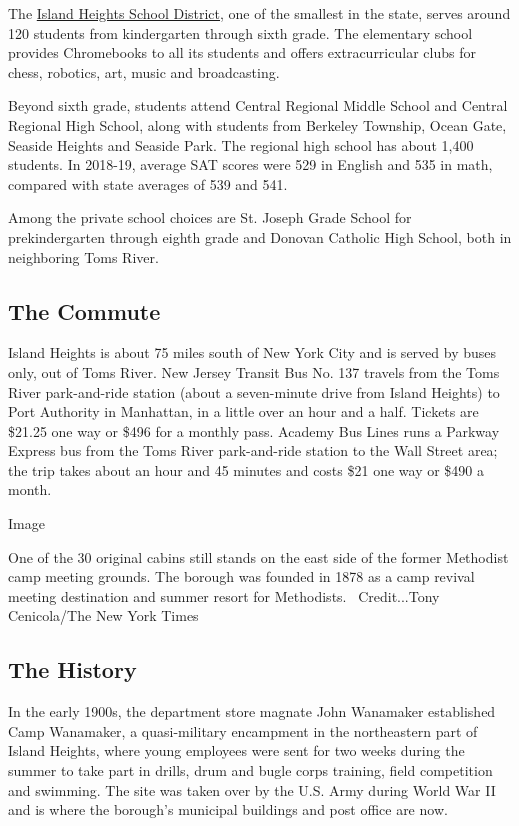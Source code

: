 The \href{http://www.islandheights.k12.nj.us/ihsd/}{Island Heights
School District}, one of the smallest in the state, serves around 120
students from kindergarten through sixth grade. The elementary school
provides Chromebooks to all its students and offers extracurricular
clubs for chess, robotics, art, music and broadcasting.

Beyond sixth grade, students attend Central Regional Middle School and
Central Regional High School, along with students from Berkeley
Township, Ocean Gate, Seaside Heights and Seaside Park. The regional
high school has about 1,400 students. In 2018-19, average SAT scores
were 529 in English and 535 in math, compared with state averages of 539
and 541.

Among the private school choices are St. Joseph Grade School for
prekindergarten through eighth grade and Donovan Catholic High School,
both in neighboring Toms River.

\hypertarget{the-commute}{%
\subsection{The Commute}\label{the-commute}}

Island Heights is about 75 miles south of New York City and is served by
buses only, out of Toms River. New Jersey Transit Bus No. 137 travels
from the Toms River park-and-ride station (about a seven-minute drive
from Island Heights) to Port Authority in Manhattan, in a little over an
hour and a half. Tickets are \$21.25 one way or \$496 for a monthly
pass. Academy Bus Lines runs a Parkway Express bus from the Toms River
park-and-ride station to the Wall Street area; the trip takes about an
hour and 45 minutes and costs \$21 one way or \$490 a month.

Image

One of the 30 original cabins still stands on the east side of the
former Methodist camp meeting grounds. The borough was founded in 1878
as a camp revival meeting destination and summer resort for Methodists.
~Credit...Tony Cenicola/The New York Times

\hypertarget{the-history}{%
\subsection{The History}\label{the-history}}

In the early 1900s, the department store magnate John Wanamaker
established Camp Wanamaker, a quasi-military encampment in the
northeastern part of Island Heights, where young employees were sent for
two weeks during the summer to take part in drills, drum and bugle corps
training, field competition and swimming. The site was taken over by the
U.S. Army during World War II and is where the borough's municipal
buildings and post office are now.

